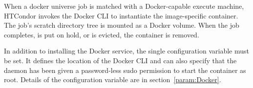 When a docker universe job is matched with a Docker-capable
execute machine,
HTCondor invokes the Docker CLI to instantiate the image-specific container.
The job's scratch directory tree is mounted as a Docker volume.
When the job completes, is put on hold, or is evicted, the container is removed.

In addition to installing the Docker service, 
the single configuration variable  must be set.
It defines the location of the Docker CLI and can also specify that
the  daemon has been given a password-less sudo
permission to start the container as root.
Details of the  configuration variable are in
section~\ref{param:Docker}.

